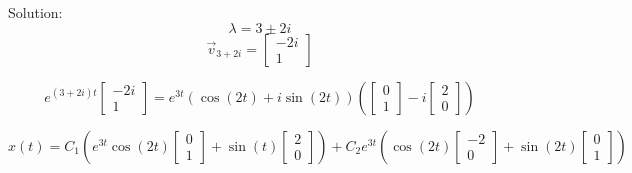 \documentclass[12pt]{article}
\begin{document}
Solution:
\[\lambda = 3 \pm 2i\]
\[\vec{v}_{3 + 2i} = \begin{bmatrix}
    -2i\\
    1
\end{bmatrix}\] 

\[e^{(3 + 2i)t} \begin{bmatrix}
    -2i\\
    1
\end{bmatrix} = e^{3t} \left(\cos (2t) + i \sin (2t)\right) \left(\begin{bmatrix}
    0\\
    1
\end{bmatrix} - i \begin{bmatrix}
    2\\0
\end{bmatrix}\right)\]

\[x(t) = C_1 \left(e^{3t} \cos (2t) \begin{bmatrix}
    0\\1
\end{bmatrix} + \sin(t) \begin{bmatrix}
    2\\0
\end{bmatrix}\right) + C_2 e^{3t} \left(\cos(2t) \begin{bmatrix}
    -2\\
    0
\end{bmatrix} + \sin (2t) \begin{bmatrix}
    0\\1
\end{bmatrix}\right)\]
\end{document}
